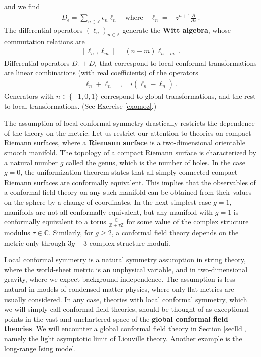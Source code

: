\documentclass[12pt, a4paper, notitlepage, twoside]{report}
\numberwithin{equation}{section}
\theoremstyle{break}
\begin{document}
and we find
\begin{align}
 D_\epsilon = \sum_{n\in {\mathbb{Z}}} \epsilon_n\ell_n  \quad \text{where} \quad \boxed{\ell_n= -z^{n+1}{\frac{\partial}{\partial z}}} \ .
\label{elln}
\end{align}
The differential operators $(\ell_n)_{n\in {\mathbb{Z}}}$ generate the \textbf{\boldmath Witt algebra}, whose commutation relations are
\begin{align}
 \boxed{[\ell_n,\ell_m]=(n-m)\ell_{n+m}}\ .
\end{align}
Differential operators $D_\epsilon +\overline{D_\epsilon}$ that correspond to local conformal transformations are linear combinations (with real coefficients) of the operators
\begin{align}
 \ell_n + \bar\ell_n \quad , \quad i(\ell_n-\bar\ell_n) \ .
 \label{ilml}
\end{align}
Generators with $n\in\{-1,0,1\}$ correspond to global transformations, and the rest to local transformations. (See Exercise \ref{exomoz}.) 

The assumption of local conformal symmetry drastically restricts the dependence of the theory on the metric.
Let us restrict our attention to theories on compact Riemann surfaces, where a \textbf{\boldmath Riemann surface} is a two-dimensional orientable smooth manifold.
The topology of a compact Riemann surface is characterized by a natural number $g$ called the genus, which is the number of holes.
In the case $g=0$, the uniformization theorem states that all simply-connected compact Riemann surfaces are conformally equivalent. 
This implies that the observables of a conformal field theory on any such manifold can be obtained from their values on the sphere by a change of coordinates.
In the next simplest case $g=1$, manifolds are not all conformally equivalent, but any manifold with $g=1$ is conformally equivalent to a torus $\frac{{\mathbb{C}}}{{\mathbb{Z}}+\tau{\mathbb{Z}}}$ for some value of the
complex structure modulus $\tau \in {\mathbb{C}}$.
Similarly, for $g\geq 2$, a conformal field theory depends on the metric only through $3g-3$ complex structure moduli. 

Local conformal symmetry is a natural symmetry assumption in string theory, where the world-sheet metric is an unphysical variable, and in two-dimensional gravity, where we expect background independence.
The assumption is less natural in models of condensed-matter physics, where only flat metrics are usually considered.
In any case, theories with local conformal symmetry, which we will simply call conformal field theories, should be thought of as exceptional points in the vast and unchartered space of the \textbf{\boldmath global conformal field theories}.
We will encounter a global conformal field theory in Section \ref{seclld}, namely the light asymptotic limit of Liouville theory.
Another example is the long-range Ising model. 
\end{document}
